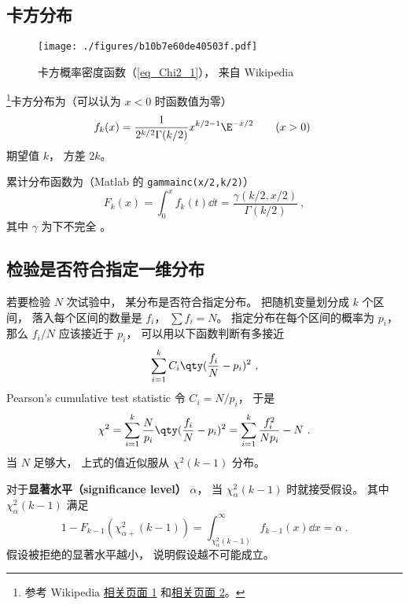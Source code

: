 
\begin{issues}
\issueDraft
\end{issues}

\subsection{卡方分布}
\begin{figure}[ht]
\centering
\texttt{[image: ./figures/b10b7e60de40503f.pdf]}
\caption{卡方概率密度函数（\autoref{eq_Chi2_1}）， 来自 Wikipedia} \label{fig_Chi2_1}
\end{figure}

\footnote{参考 Wikipedia \href{https://en.wikipedia.org/wiki/Chi-squared_distribution}{相关页面 1} 和\href{https://en.wikipedia.org/wiki/Pearson's_chi-squared_test}{相关页面 2}。}卡方分布为（可以认为 $x<0$ 时函数值为零）
\begin{equation}\label{eq_Chi2_1}
f_k(x) = \frac{1}{2^{k/2}\Gamma(k/2)}x^{k/2-1}\E^{-x/2} \qquad (x > 0)~
\end{equation}
期望值 $k$， 方差 $2k$。

累计分布函数为（Matlab 的 \verb`gammainc(x/2,k/2)`）
\begin{equation}
F_k(x) = \int_0^{x} f_k(t) \dd{t} = \frac{\gamma(k/2, x/2)}{\Gamma(k/2)}~,
\end{equation}
其中 $\gamma$ 为下不完全 。

\subsection{检验是否符合指定一维分布}
若要检验 $N$ 次试验中， 某分布是否符合指定分布。 把随机变量划分成 $k$ 个区间， 落入每个区间的数量是 $f_i$， $\sum f_i = N$。 指定分布在每个区间的概率为 $p_i$， 那么 $f_i/N$ 应该接近于 $p_i$， 可以用以下函数判断有多接近
\begin{equation}
\sum_{i=1}^k C_i \qty(\frac{f_i}{N} - p_i)^2~,
\end{equation}
Pearson's cumulative test statistic 令 $C_i = N/p_i$， 于是
\begin{equation}
\chi^2 = \sum_{i=1}^k \frac{N}{p_i} \qty(\frac{f_i}{N} - p_i)^2 = \sum_{i=1}^k \frac{f_i^2}{Np_i} - N~.
\end{equation}
当 $N$ 足够大， 上式的值近似服从 $\chi^2(k-1)$ 分布。

对于\textbf{显著水平（significance level）} $\alpha$， 当 $\chi_{\alpha}^2(k-1)$ 时就接受假设。 其中 $\chi_{\alpha}^2(k-1)$ 满足
\begin{equation}
1 - F_{k-1}(\chi_{\alpha+}^2(k-1)) = \int_{\chi_{\alpha}^2(k-1)}^\infty f_{k-1}(x) \dd{x} = \alpha~.
\end{equation}
假设被拒绝的显著水平越小， 说明假设越不可能成立。

